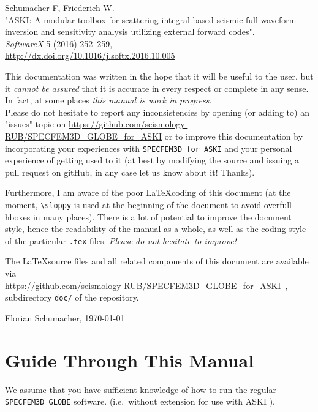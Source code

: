 \documentclass[12pt,a4paper]{article}
\newcommand{\lcode}[1]{\nolinkurl{#1}}
\newcommand{\ASKI}{ {\ttfamily ASKI} }
\begin{document}
Schumacher F, Friederich W.\\
"ASKI: A modular toolbox for scattering-integral-based seismic full waveform 
inversion and sensitivity analysis utilizing external forward codes".\\
\emph{SoftwareX} 5 (2016) 252--259,\\
\url{http://dx.doi.org/10.1016/j.softx.2016.10.005}

\vspace{1em}

This documentation was written in the hope that it will be useful to the user,
but it \emph{cannot be assured} that it is accurate in every respect or complete in any sense.
In fact, at some places \emph{this manual is work in progress}.\\
Please do not hesitate to report any inconsistencies by
opening (or adding to) an "issues" topic on \url{https://github.com/seismology-RUB/SPECFEM3D_GLOBE_for_ASKI}
or to improve this documentation by incorporating your experiences with \lcode{SPECFEM3D for ASKI} 
and your personal experience of getting used to it (at best by modifying the source and issuing a pull request
on gitHub, in any case let us know about it! Thanks).

Furthermore, I am aware of the poor \LaTeX coding of this document (at the moment, \verb+\sloppy+ is used
at the beginning of the document to avoid overfull hboxes in many places). There is a lot of potential
to improve the document 
style, hence the readability of the manual as a whole, as well as the coding style of the 
particular \lcode{.tex} files. \emph{Please do not hesitate to improve!}

The \LaTeX source files and all related components of this document are available via\\
\url{https://github.com/seismology-RUB/SPECFEM3D_GLOBE_for_ASKI}~, subdirectory 
\lcode{doc/} of the repository.
\begin{flushright}
Florian Schumacher, \mydate \today
\end{flushright}

\newpage
%
\section*{Guide Through This Manual}
%
We assume that you have sufficient knowledge of how to run the regular \lcode{SPECFEM3D_GLOBE} software.
(i.e.\ without extension for use with \ASKI{}).
\end{document}
